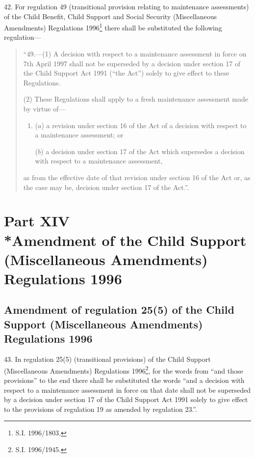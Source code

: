 \documentclass[12pt,a4paper]{article}
\begin{document}
42.  For regulation 49 (transitional provision relating to maintenance assessments) of the Child Benefit, Child Support and Social Security (Miscellaneous Amendments) Regulations 1996\footnote{\frenchspacing S.I. 1996/1803.} there shall be substituted the following regulation—
\begin{quotation}
“49.—(1) A decision with respect to a maintenance assessment in force on 7th April 1997 shall not be superseded by a decision under section 17 of the Child Support Act 1991 (“the Act”) solely to give effect to these Regulations.

(2) These Regulations shall apply to a fresh maintenance assessment made by virtue of—
\begin{enumerate}\item[]
($a$) a revision under section 16 of the Act of a decision with respect to a maintenance assessment; or

($b$) a decision under section 17 of the Act which supersedes a decision with respect to a maintenance assessment,
\end{enumerate}
as from the effective date of that revision under section 16 of the Act or, as the case may be, decision under section 17 of the Act.”.
\end{quotation}

\section[Part XIV --- Amendment of the Child Support (Miscellaneous Amendments) Regulations 1996]{Part XIV\\*Amendment of the Child Support (Miscellaneous Amendments) Regulations 1996}

\renewcommand\parthead{--- Part XIV}

\subsection[43. Amendment of regulation 25(5) of the Child Support (Miscellaneous Amendments) Regulations 1996]{Amendment of regulation 25(5) of the Child Support (Miscellaneous Amendments) Regulations 1996}

43.  In regulation 25(5) (transitional provisions) of the Child Support (Miscellaneous Amendments) Regulations 1996\footnote{\frenchspacing S.I. 1996/1945.}, for the words from “and those provisions” to the end there shall be substituted the words “and a decision with respect to a maintenance assessment in force on that date shall not be superseded by a decision under section 17 of the Child Support Act 1991 solely to give effect to the provisions of regulation 19 as amended by regulation 23.”.
\end{document}
